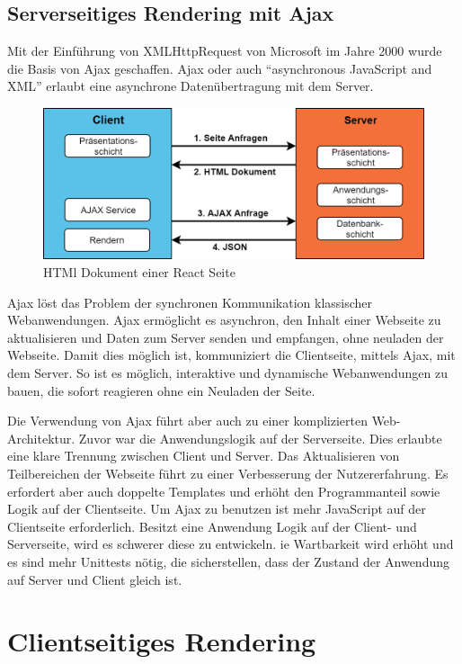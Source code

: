 \documentclass[runningheads]{llncs}
\begin{document}
\subsection{Serverseitiges Rendering mit Ajax}
\label{subsec:Serverseitiges Rendering mit Ajax}
Mit der Einführung von XMLHttpRequest von Microsoft im Jahre 2000 wurde die Basis von Ajax geschaffen. 
Ajax oder auch “asynchronous JavaScript and XML” erlaubt eine asynchrone Datenübertragung mit dem Server.
\begin{figure}[h]
  \centering
  \includegraphics[width=12cm]{images/serverajax}
  \caption{HTMl Dokument einer React Seite}
\end{figure}
Ajax löst das Problem der synchronen Kommunikation klassischer Webanwendungen. 
Ajax ermöglicht es asynchron, 
den Inhalt einer Webseite zu aktualisieren und Daten zum Server senden und empfangen, 
ohne neuladen der Webseite. Damit dies möglich ist, 
kommuniziert die Clientseite, mittels Ajax, mit dem Server. 
So ist es möglich, interaktive und dynamische Webanwendungen zu bauen, 
die sofort reagieren ohne ein Neuladen der Seite.

Die Verwendung von Ajax führt aber auch zu einer komplizierten Web-Architektur. 
Zuvor war die Anwendungslogik auf der Serverseite. 
Dies erlaubte eine klare Trennung zwischen Client und Server. 
Das Aktualisieren von Teilbereichen der Webseite führt 
zu einer Verbesserung der Nutzererfahrung. 
Es erfordert aber auch doppelte Templates und erhöht den Programmanteil sowie Logik auf der Clientseite. 
Um Ajax zu benutzen ist mehr JavaScript auf der Clientseite erforderlich. 
Besitzt eine Anwendung Logik auf der Client- und Serverseite, 
wird es schwerer diese zu entwickeln. 
ie Wartbarkeit wird erhöht und es sind mehr Unittests nötig, 
die sicherstellen, dass der Zustand der Anwendung auf Server und 
Client gleich ist. 
\newpage

\section{Clientseitiges Rendering}
\label{sec:Clientseitiges Rendering}
\end{document}
